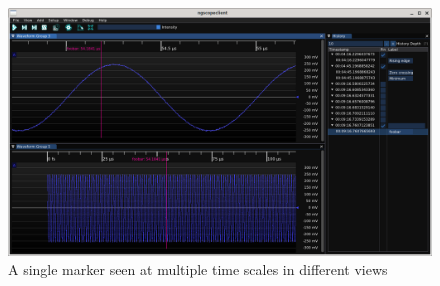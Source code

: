\begin{figure}[H]
\centering
\includegraphics[width=13cm]{ng-images/marker-multiview.png}
\caption{A single marker seen at multiple time scales in different views}
\label{marker-multiview}
\end{figure}

